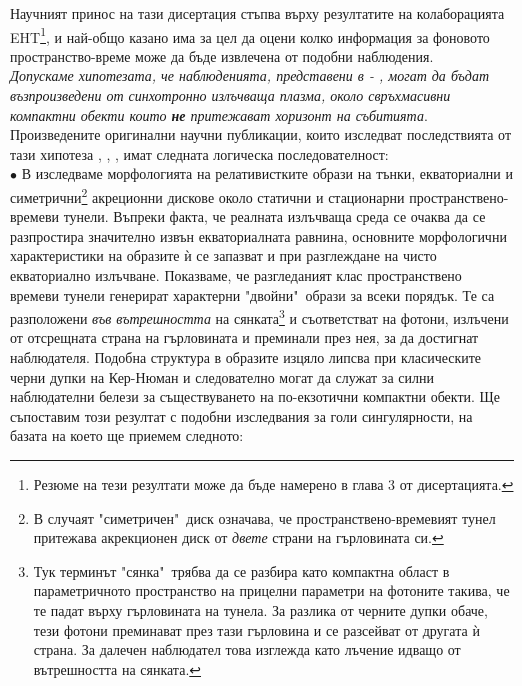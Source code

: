 \documentclass[12pt]{article}
\numberwithin{equation}{section}
\numberwithin{figure}{section}
\begin{document}
	
	Научният принос на тази дисертация стъпва върху резултатите на колаборацията EHT\footnote{Резюме на тези резултати може да бъде намерено в глава 3 от дисертацията.}, и най-общо казано има за цел да оцени колко информация за фоновото пространство-време може да бъде извлечена от подобни наблюдения.\\

	\emph{Допускаме хипотезата, че наблюденията, представени в \cite{EHT_M87_I} - \cite{EHT_SGR_VIII}, могат да бъдат възпроизведени от синхотронно излъчваща плазма, около свръхмасивни компактни обекти които \textbf{не} притежават хоризонт на събитията}.\\\newline
	Произведените оригинални научни публикации, които изследват последствията от тази хипотеза \cite{Deliyski2022}, \cite{Delijski2022}, \cite{Deliyski2023}, \cite{Deliyski2024} имат следната логическа последователност: \\
	
	\noindent$\bullet$ В \cite{Deliyski2022} изследваме морфологията на релативистките образи на тънки, екваториални и симетрични\footnote{ В случаят "симетричен"$\,$ диск означава, че пространствено-времевият тунел притежава акрекционен диск от \emph{двете} страни на гърловината си.} акреционни дискове около статични и стационарни пространствено-времеви тунели. Въпреки факта, че реалната излъчваща среда се очаква да се разпростира значително извън екваториалната равнина, основните морфологични характеристики на образите ѝ се запазват и при разглеждане на чисто екваториално излъчване. Показваме, че разгледаният клас пространствено времеви тунели генерират характерни "двойни"$\,$ образи за всеки порядък. Те са разположени \emph{във вътрешността} на сянката\footnote{Тук терминът "сянка"$\,$ трябва да се разбира като компактна област в параметричното пространство на прицелни параметри на фотоните такива, че те падат върху гърловината на тунела. За разлика от черните дупки обаче, тези фотони преминават през тази гърловина и се разсейват от другата ѝ страна. За далечен наблюдател това изглежда като лъчение идващо от вътрешността на сянката.} и съответстват на фотони, излъчени от отсрещната страна на гърловината и преминали през нея, за да достигнат наблюдателя. Подобна структура в образите изцяло липсва при класическите черни дупки на Кер-Нюман и следователно могат да служат за силни наблюдателни белези за съществуването на по-екзотични компактни обекти. Ще съпоставим този резултат с подобни изследвания за голи сингулярности, на базата на което ще приемем следното:\\
	
\end{document}
